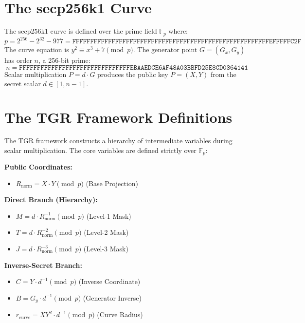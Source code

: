 \documentclass[11pt, a4paper, twoside]{book}
\begin{document}
\section{The secp256k1 Curve}
The secp256k1 curve is defined over the prime field $\mathbb{F}_p$ where:
\begin{equation}
    p = 2^{256} - 2^{32} - 977 = \texttt{FFFFFFFFFFFFFFFFFFFFFFFFFFFFFFFFFFFFFFFFFFFFFFFFFFFFFFFEFFFFFC2F}
\end{equation}
The curve equation is $y^2 \equiv x^3 + 7 \pmod p$. The generator point $G = (G_x, G_y)$ has order $n$, a 256-bit prime:
\begin{equation}
    n = \texttt{FFFFFFFFFFFFFFFFFFFFFFFFFFFFFFFEBAAEDCE6AF48A03BBFD25E8CD0364141}
\end{equation}
Scalar multiplication $P = d \cdot G$ produces the public key $P = (X, Y)$ from the secret scalar $d \in [1, n-1]$.

\section{The TGR Framework Definitions}
The TGR framework constructs a hierarchy of intermediate variables during scalar multiplication. The core variables are defined strictly over $\mathbb{F}_p$:

\textbf{Public Coordinates:}
\begin{itemize}
    \item $R_{\text{norm}} = X \cdot Y \pmod p$ (Base Projection)
\end{itemize}

\textbf{Direct Branch (Hierarchy):}
\begin{itemize}
    \item $M = d \cdot R_{\text{norm}}^{-1} \pmod p$ (Level-1 Mask)
    \item $T = d \cdot R_{\text{norm}}^{-2} \pmod p$ (Level-2 Mask)
    \item $J = d \cdot R_{\text{norm}}^{-3} \pmod p$ (Level-3 Mask)
\end{itemize}

\textbf{Inverse-Secret Branch:}
\begin{itemize}
    \item $C = Y \cdot d^{-1} \pmod p$ (Inverse Coordinate)
    \item $B = G_y \cdot d^{-1} \pmod p$ (Generator Inverse)
    \item $r_{\text{curve}} = X Y^2 \cdot d^{-1} \pmod p$ (Curve Radius)
\end{itemize}
\end{document}
